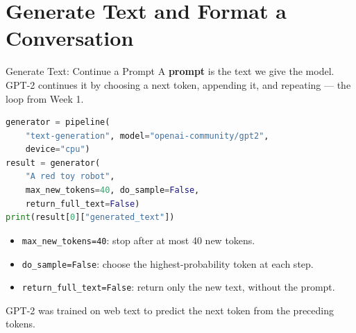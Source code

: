 \documentclass[aspectratio=169]{beamer}
\begin{document}
\section{Generate Text and Format a Conversation}
\begin{frame}[fragile]{Generate Text: Continue a Prompt}
  \small A \textbf{prompt} is the text we give the model. GPT-2 continues it by choosing a next token, appending it, and repeating --- the loop from Week 1.
  \begin{lstlisting}[language=Python]
generator = pipeline(
    "text-generation", model="openai-community/gpt2",
    device="cpu")
result = generator(
    "A red toy robot",
    max_new_tokens=40, do_sample=False,
    return_full_text=False)
print(result[0]["generated_text"])
  \end{lstlisting}
  \begin{itemize}
    \item \texttt{max\_new\_tokens=40}: stop after at most 40 new tokens.
    \item \texttt{do\_sample=False}: choose the highest-probability token at each step.
    \item \texttt{return\_full\_text=False}: return only the new text, without the prompt.
  \end{itemize}
  \small GPT-2 was trained on web text to predict the next token from the preceding tokens.
\end{frame}
\end{document}
